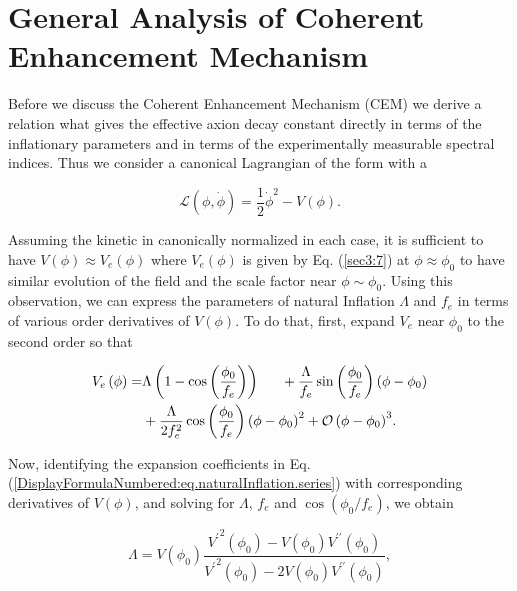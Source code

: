 \documentclass[12pt]{article}
\begin{document}
\section{General Analysis of Coherent Enhancement Mechanism \label{sec4}}
Before we discuss the Coherent Enhancement Mechanism (CEM) we derive a relation what gives the effective axion decay constant directly
in terms of the inflationary parameters and in terms of the experimentally measurable spectral indices.  
Thus we consider a canonical Lagrangian of the form with a 

\begin{equation}
	\mathcal{L}\left(\phi,\dot{\phi}\right)=\frac{1}{2}{\dot{\phi}}^2-V\left(\phi \right).
\end{equation}

Assuming  the kinetic in canonically normalized in each case, it is sufficient to have $V\left(\phi \right)\approx V_{e}\left(\phi \right)$ 
  where $V_{e}\left(\phi \right)$ is given by Eq. (\ref{sec3:7})
at $\phi \approx \phi_0$ to have similar evolution of the field and the scale factor near $\phi\sim \phi_0$. Using this observation, we can  express the parameters of natural Inflation $\Lambda$ and $f_e$ in terms of various order derivatives of $V\left(\phi \right)$. To do that, first, expand $V_{e}$ near $\phi_0$ to the second order so that 

\begin{equation}\label{DisplayFormulaNumbered:eq.naturalInflation.series} 
\begin{split}
	 V_{e}\left(\phi \right)=&\Lambda \left(1-\cos\left(\frac{\phi_0}{f_e}\right)\right) 
	 \indent{}+\frac{\Lambda}{f_e}\sin\left(\frac{\phi_0}{f_e}\right)\left(\phi -\phi_0\right)\\
	 &+\frac{\Lambda}{2f_e^2}\cos\left(\frac{\phi_0}{f_e}\right){\left(\phi -\phi_0\right)}^2+{\mathcal{O}\left(\phi -\phi_0\right)}^3.
\end{split}
\end{equation}

Now, identifying the expansion coefficients in Eq.(\ref{DisplayFormulaNumbered:eq.naturalInflation.series}) with corresponding derivatives of $V\left(\phi \right)$, and solving for $\Lambda$, $f_e$ and $\cos\left(\phi_0/f_e\right)$, we obtain

\begin{equation}\label{DisplayFormulaNumbered:eq.lambda.potential} 
	\Lambda =V\left(\phi_0\right)\frac{{V^\prime}^2\left(\phi_0\right)-V\left(\phi_0\right)V^{\prime\prime} \left(\phi_0\right)}{{V^\prime}^2\left(\phi_0\right)-2V\left(\phi_0\right)V^{\prime\prime} \left(\phi_0\right)},
\end{equation}
\end{document}
